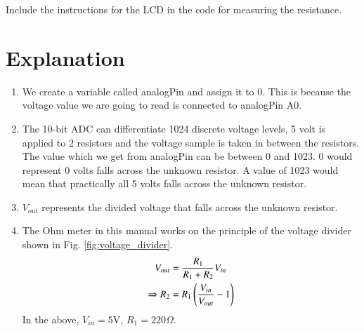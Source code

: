 \documentclass[journal,12pt,twocolumn]{IEEEtran}
\begin{document}
%
%
%
%
\begin{problem}
Include the instructions for the LCD in the code for measuring the resistance. 
\end{problem}
\solution 
%

\section{Explanation}



\begin{enumerate}


\item We create a variable called analogPin and assign it to 0. 
This is because the voltage value we are going to read is connected to analogPin A0.



\item  The 10-bit ADC can differentiate 1024 discrete voltage levels, 5 volt is applied to 2 resistors and the voltage sample is taken in between the resistors. The value which we get from analogPin can be between 0 and 1023. 0 would represent 0 volts falls across the unknown resistor. A value of 1023 would mean that practically all 5 volts falls across the unknown resistor.



\item  $V_{out}$ represents the divided voltage that falls across the unknown resistor.



\item  The Ohm meter in this manual works on the principle of the voltage divider shown in Fig. \ref{fig:voltage_divider}.
%
\begin{align}
V_{out}&=\frac{R_1}{R_1+R_2}V_{in} \\
\Rightarrow R_2&=R_1\left(\frac{V_{in}}{V_{out}}-1\right)
\end{align}
%
In the above, $V_{in} = 5$V, $R_1 = 220 \Omega$.
\end{enumerate}
\end{document}
